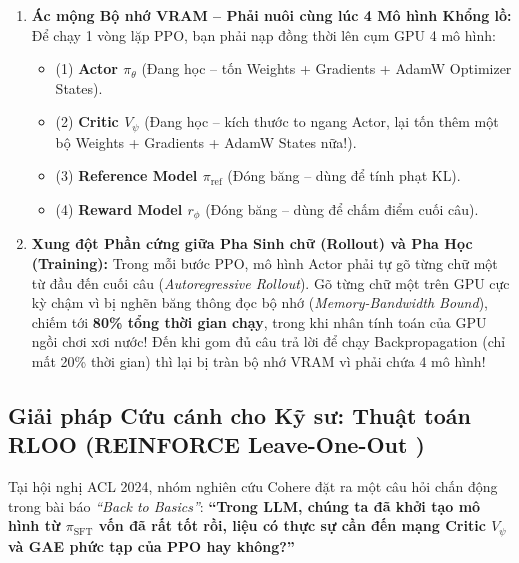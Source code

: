 \begin{enumerate}[leftmargin=1.2cm]
    \item \textbf{Ác mộng Bộ nhớ VRAM -- Phải nuôi cùng lúc 4 Mô hình Khổng lồ:}
    Để chạy 1 vòng lặp PPO, bạn phải nạp đồng thời lên cụm GPU 4 mô hình:
    \begin{itemize}
        \item (1) \textbf{Actor $\pi_\theta$} (Đang học -- tốn Weights + Gradients + AdamW Optimizer States).
        \item (2) \textbf{Critic $V_\psi$} (Đang học -- kích thước to ngang Actor, lại tốn thêm một bộ Weights + Gradients + AdamW States nữa!).
        \item (3) \textbf{Reference Model $\pi_{\text{ref}}$} (Đóng băng -- dùng để tính phạt KL).
        \item (4) \textbf{Reward Model $r_\phi$} (Đóng băng -- dùng để chấm điểm cuối câu).
    \end{itemize}
    \item \textbf{Xung đột Phần cứng giữa Pha Sinh chữ (Rollout) và Pha Học (Training):}
    Trong mỗi bước PPO, mô hình Actor phải tự gõ từng chữ một từ đầu đến cuối câu (\textit{Autoregressive Rollout}). Gõ từng chữ một trên GPU cực kỳ chậm vì bị nghẽn băng thông đọc bộ nhớ (\textit{Memory-Bandwidth Bound}), chiếm tới \textbf{80\% tổng thời gian chạy}, trong khi nhân tính toán của GPU ngồi chơi xơi nước! Đến khi gom đủ câu trả lời để chạy Backpropagation (chỉ mất 20\% thời gian) thì lại bị tràn bộ nhớ VRAM vì phải chứa 4 mô hình!
\end{enumerate}

\subsection{Giải pháp Cứu cánh cho Kỹ sư: Thuật toán RLOO (REINFORCE Leave-One-Out \citealt{ahmadian2024back})}
Tại hội nghị ACL 2024, nhóm nghiên cứu Cohere \citep{ahmadian2024back} đặt ra một câu hỏi chấn động trong bài báo \textit{``Back to Basics''}: \textbf{``Trong LLM, chúng ta đã khởi tạo mô hình từ $\pi_{\text{SFT}}$ vốn đã rất tốt rồi, liệu có thực sự cần đến mạng Critic $V_\psi$ và GAE phức tạp của PPO hay không?''}

